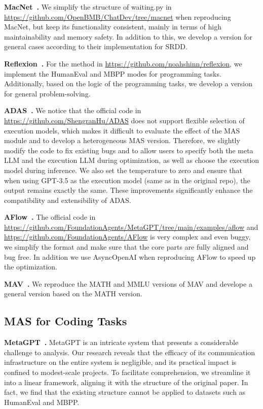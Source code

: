 \documentclass{article}
\begin{document}
\textbf{MacNet~\cite{macnet}.}  
We simplify the structure of waiting.py in \url{https://github.com/OpenBMB/ChatDev/tree/macnet} when reproducing MacNet, but keep its functionality consistent, mainly in terms of high maintainability and memory safety. 
In addition to this, we develop a version for general cases according to their implementation for SRDD.

\textbf{Reflexion~\cite{shinn2023reflexion}.}  
For the method in \url{https://github.com/noahshinn/reflexion}, we implement the HumanEval and MBPP modes for programming tasks.
Additionally, based on the logic of the programming tasks, we develop a version for general problem-solving.

\textbf{ADAS~\cite{adas}.}
 We notice that the official code in \url{https://github.com/ShengranHu/ADAS} does not support flexible selection of execution models, which makes it difficult to evaluate the effect of the MAS module and to develop a heterogeneous MAS version.
 Therefore, we slightly modify the code to fix existing bugs and to allow users to specify both the meta LLM and the execution LLM during optimization, as well as choose the execution model during inference.
 We also set the temperature to zero and ensure that when using GPT-3.5 as the execution model (same as in the original repo), the output remains exactly the same.
 These improvements significantly enhance the compatibility and extensibility of ADAS.

\textbf{AFlow~\cite{aflow}.}  
The official code in \url{https://github.com/FoundationAgents/MetaGPT/tree/main/examples/aflow} and \url{https://github.com/FoundationAgents/AFlow} is very complex and even buggy, we simplify the format and make sure that the core parts are fully aligned and bug free. 
In addition we use AsyncOpenAI when reproducing AFlow to speed up the optimization.

\textbf{MAV~\cite{mav}.}  
We reproduce the MATH and MMLU versions of MAV and develope a general version based on the MATH version.

\subsection{MAS for Coding Tasks}

\textbf{MetaGPT~\cite{hongmetagpt}.}  
MetaGPT is an intricate system that presents a considerable challenge to analysis.
Our research reveals that the efficacy of its communication infrastructure on the entire system is negligible, and its practical impact is confined to modest-scale projects.
To facilitate comprehension, we streamline it into a linear framework, aligning it with the structure of the original paper.
In fact, we find that the existing structure cannot be applied to datasets such as HumanEval and MBPP.
\end{document}
